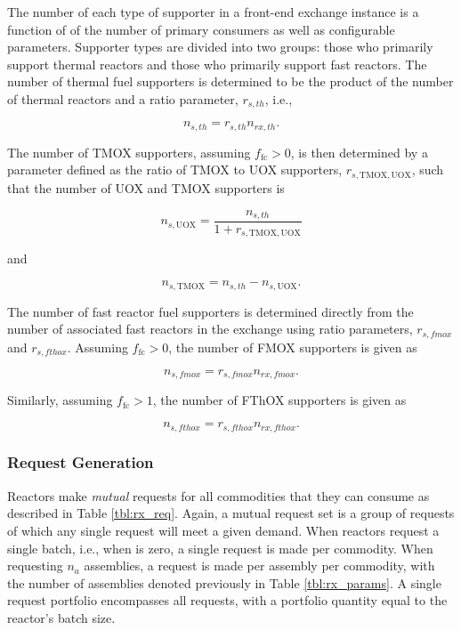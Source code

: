 The number of each type of supporter in a front-end exchange instance is a
function of of the number of primary consumers as well as configurable
parameters. Supporter types are divided into two groups: those who primarily
support thermal reactors and those who primarily support fast reactors. The
number of thermal fuel supporters is determined to be the product of the number
of thermal reactors and a ratio parameter, $r_{s, th}$, i.e.,

\begin{equation}
n_{s, th} = r_{s, th} n_{rx, th}.
\end{equation}

The number of TMOX supporters, assuming $f_{\text{fc}} > 0$, is then determined
by a parameter defined as the ratio of TMOX to UOX supporters, $r_{s,
  \text{TMOX}, \text{UOX}}$, such that the number of UOX and TMOX supporters is

\begin{equation}
n_{s, \text{UOX}} = \frac{n_{s, th}}{1 + r_{s, \text{TMOX}, \text{UOX}}}
\end{equation}

\noindent
and

\begin{equation}
n_{s, \text{TMOX}} = n_{s, th} - n_{s, \text{UOX}}.
\end{equation}

The number of fast reactor fuel supporters is determined directly from the number
of associated fast reactors in the exchange using ratio parameters,
$r_{s, fmox}$ and $r_{s, fthox}$. Assuming $f_{\text{fc}} > 0$, the number of FMOX
supporters is given as

\begin{equation}
n_{s, fmox} = r_{s, fmox} n_{rx, fmox}.
\end{equation}

\noindent
Similarly, assuming $f_{\text{fc}} > 1$, the number of FThOX supporters is given as  

\begin{equation}
n_{s, fthox} = r_{s, fthox} n_{rx, fthox}.
\end{equation}

\subsubsection{Request Generation}\label{method:setup:front:reqgen}

Reactors make \textit{mutual} requests for all commodities that they can consume
as described in Table \ref{tbl:rx_req}. Again, a mutual request set is a group
of requests of which any single request will meet a given demand. When reactors
request a single batch, i.e., when \frx is zero, a single request is made
per commodity. When requesting $n_a$ assemblies, a request is made per assembly
per commodity, with the number of assemblies denoted previously in Table
\ref{tbl:rx_params}. A single request portfolio encompasses all requests, with a
portfolio quantity equal to the reactor's batch size.

